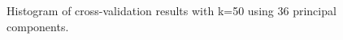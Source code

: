\documentclass[paper=a4, fontsize=11pt]{scrartcl} %
\begin{document}
\begin{figure}[h]
    \centering
    \caption{Histogram of cross-validation results with k=50 using 36 principal components.}
    \label{fig:hist}
\end{figure}



\end{document}
